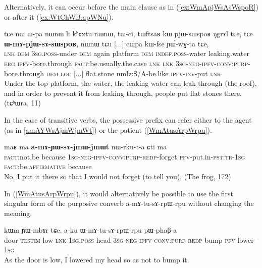 \documentclass[oldfontcommands,oneside,a4paper,11pt]{article}
\newcommand{\ipa}[1]{{\phon \mbox{#1}}} %
\newcommand{\refb}[1]{(\ref{#1})}
\begin{document}
Alternatively, it can occur   before the main clause as in \refb{ex:WmApjWsAsWspoR} or after it \refb{ex:WtChWB.apWNu}.

\begin{exe}
\ex \label{ex:WmApjWsAsWspoR}
\gll
\ipa{tɕe}   	\ipa{nɯ}   	\ipa{ɯ-pa}   	\ipa{nɯnɯ}   	\ipa{li}   	\ipa{kʰɤxtu}   	\ipa{nɯnɯ,}   	\ipa{tɯ-ci,}   	\ipa{tɯftsaʁ}   	\ipa{kɯ}   	\ipa{pjɯ-sɯspoʁ}   	\ipa{ŋgrɤl}   	\ipa{tɕe,}    \ipa{tɕe}   	\ipa{\textbf{ɯ-mɤ-pjɯ-sɤ-sɯspoʁ},}   	\ipa{nɯnɯ}   	\ipa{tɕu}   [...] \ipa{cɯpa}   	\ipa{kɯ-fse}   	\ipa{ɲɯ́-wɣ-ta}   	\ipa{tɕe,}   \\
\textsc{lnk} \textsc{dem} \textsc{3sg.poss}-under \textsc{dem} again platform \textsc{dem} \textsc{indef.poss}-water leaking.water \textsc{erg} \textsc{ipfv}-bore.through \textsc{fact}:be.usually.the.case \textsc{lnk} \textsc{lnk} \textsc{3sg-neg-ipfv-conv:purp}-bore.through \textsc{dem} \textsc{loc} [...] flat.stone nm\textsc{}lz:S/A-be.like \textsc{ipfv-inv}-put \textsc{lnk} \\
\glt Under the top platform, the water, the leaking water can leak through (the roof), and in order to prevent it from leaking through, people put flat stones there. (tɕʰɯra, 11)
\end{exe}

In the case of transitive verbs, the possessive prefix can refer either to the agent (as in \ref{amAYWsAjmWjmWt}) or the patient \refb{WmAtusArpWrpu}.

\begin{exe}
\ex \label{amAYWsAjmWjmWt}
\gll 
\ipa{maʁ}   	\ipa{ma}   	\ipa{\textbf{a-mɤ-ɲɯ-sɤ-jmɯ-jmɯt}}   	\ipa{nɯ-rku-t-a}   	\ipa{ɕti}   	\ipa{ma}   \\
\textsc{fact}:not.be because \textsc{1sg-neg-ipfv-conv:purp-redp}-forget \textsc{pfv}-put.in-\textsc{pst:tr-1sg} \textsc{fact}:be:\textsc{affirmative} because \\
\glt No, I put it there so that I would not forget (to tell you). (The frog, 172)
\end{exe}

In \refb{WmAtusArpWrpu}, it would alternatively be possible to use the first singular form of the purposive converb \ipa{a-mɤ-tu-sɤ-rpɯ-rpu}   without changing the meaning.

 \begin{exe}
\ex \label{WmAtusArpWrpu}
\gll 
\ipa{kɯm}    	\ipa{ɲɯ-mbɤr}    	\ipa{tɕe,}    	\ipa{a-ku}    	\ipa{ɯ-mɤ-tu-sɤ-rpɯ-rpu}    	\ipa{pɯ-phaβ-a}    \\
door \textsc{testim}-low \textsc{lnk} \textsc{1sg.poss}-head \textsc{3sg-neg-ipfv-conv:purp-redp}-bump \textsc{pfv}-lower-\textsc{1sg}\\
\glt As the door is low, I lowered my head so as not to bump it.
\end{exe}
\end{document}

